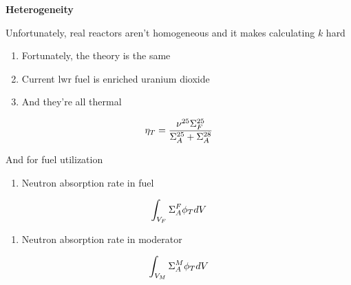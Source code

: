 \documentclass[aspectratio=1610,pdftex,dvipsnames,compress,xcolor={dvipsnames}]{beamer}
\newcommand{\acs}{\acrshort} %
\begin{document}
\begin{frame}[plain]{}
    \centering\LARGE\textbf{Heterogeneity}
\end{frame}


\addtocounter{framenumber}{-1} 
\begin{frame}{Unfortunately, real reactors aren't homogeneous and it makes calculating $k$ hard}
    \begin{enumerate}[series=outerlist,topsep=0pt,itemsep=21pt,leftmargin=*,label=(\arabic*)]
        \item[]Fortunately, the theory is the same
        \item[]Current \acs{lwr} fuel is enriched uranium dioxide
        \item[]And they're all thermal
    \end{enumerate}

    \vspace*{\fill}

    \begin{equation}
        \LARGE
        \eta_T = \frac{\nu^{25}\Sigma_F^{25}}{\Sigma_A^{25}+\Sigma_A^{28}}
    \end{equation}
\end{frame}


\begin{frame}{And for fuel utilization}
    \begin{enumerate}[series=outerlist,topsep=0pt,itemsep=21pt,leftmargin=*,label=(\arabic*)]
        \item[]Neutron absorption rate in fuel
    \end{enumerate}

    \vspace*{\fill}

    \begin{equation}
        \LARGE
        \int_{V_F} \Sigma_A^F \phi_T dV
    \end{equation}

    \vspace*{\fill}

    \begin{enumerate}[series=outerlist,topsep=0pt,itemsep=21pt,leftmargin=*,label=(\arabic*)]
        \item[]Neutron absorption rate in moderator
    \end{enumerate}

    \vspace*{\fill}

    \begin{equation}
        \LARGE
        \int_{V_M} \Sigma_A^M \phi_T dV
    \end{equation}
\end{frame}
\end{document}
